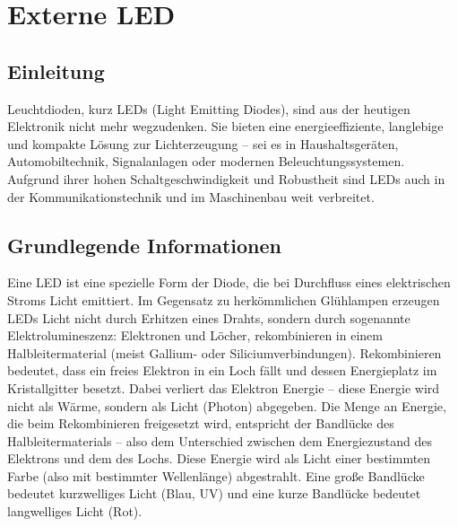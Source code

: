 %
%
%


\chapter{Externe LED}\label{LED}
\section{Einleitung}
Leuchtdioden, kurz LEDs (Light Emitting Diodes), sind aus der heutigen Elektronik nicht mehr wegzudenken. Sie bieten eine energieeffiziente, langlebige und kompakte Lösung zur Lichterzeugung – sei es in Haushaltsgeräten, Automobiltechnik, Signalanlagen oder modernen Beleuchtungssystemen. Aufgrund ihrer hohen Schaltgeschwindigkeit und Robustheit sind LEDs auch in der Kommunikationstechnik und im Maschinenbau weit verbreitet. \cite{Haeberle:2018} \cite{Hering:2024}

\section{Grundlegende Informationen}
Eine LED ist eine spezielle Form der Diode, die bei Durchfluss eines elektrischen Stroms Licht emittiert. Im Gegensatz zu herkömmlichen Glühlampen erzeugen LEDs Licht nicht durch Erhitzen eines Drahts, sondern durch sogenannte Elektrolumineszenz: Elektronen und \glqq Löcher\grqq, rekombinieren in einem Halbleitermaterial (meist Gallium- oder Siliciumverbindungen). Rekombinieren bedeutet, dass ein freies Elektron in ein Loch fällt und dessen Energieplatz im Kristallgitter besetzt. Dabei verliert das Elektron Energie – diese Energie wird nicht als Wärme, sondern als Licht (Photon) abgegeben. Die Menge an Energie, die beim Rekombinieren freigesetzt wird, entspricht der Bandlücke des Halbleitermaterials – also dem Unterschied zwischen dem Energiezustand des Elektrons und dem des Lochs. Diese Energie wird als Licht einer bestimmten Farbe (also mit bestimmter Wellenlänge) abgestrahlt. Eine große Bandlücke bedeutet kurzwelliges Licht (Blau, UV) und eine kurze Bandlücke bedeutet langwelliges Licht (Rot). \cite{Haeberle:2018} \cite{Hering:2024} \cite{Falcon:2025}

